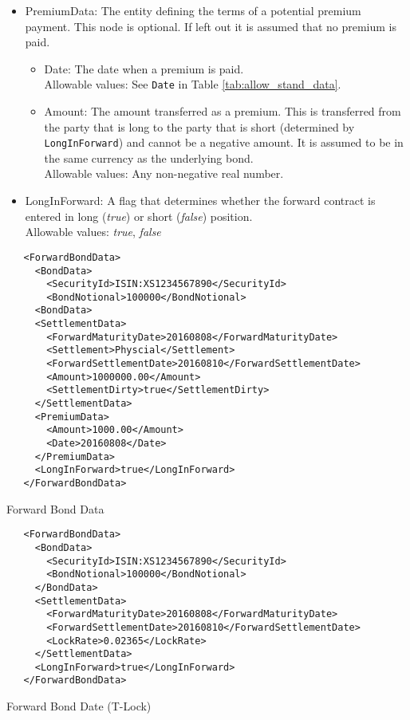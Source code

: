 \begin{itemize}
\begin{itemize}
   \end{itemize}
   \item PremiumData: The entity defining the terms of a potential premium payment. This node is optional. If left out it is assumed that no premium is paid.
   \begin{itemize}
       \item Date: The date when a premium is paid. \\
       Allowable values: See \lstinline!Date! in Table \ref{tab:allow_stand_data}.       
       \item Amount: The amount transferred as a premium. This is transferred from the party that is long to the party
         that is short (determined by \lstinline!LongInForward!) and cannot be a negative amount. It is assumed to be in
         the same currency as the underlying bond.\\
         Allowable values: Any non-negative real number.
   \end{itemize}
   \item LongInForward: A flag that determines whether the forward contract is entered in long (\emph{true}) or short
     (\emph{false}) position. \\
       Allowable values: \emph{true}, \emph{false}     
\end{itemize}
 
\begin{listing}[H]
\begin{verbatim}
   <ForwardBondData>
     <BondData>
       <SecurityId>ISIN:XS1234567890</SecurityId>
       <BondNotional>100000</BondNotional>
     <BondData>
     <SettlementData>
       <ForwardMaturityDate>20160808</ForwardMaturityDate>
       <Settlement>Physcial</Settlement>
       <ForwardSettlementDate>20160810</ForwardSettlementDate>
       <Amount>1000000.00</Amount>
       <SettlementDirty>true</SettlementDirty>
     </SettlementData>
     <PremiumData>
       <Amount>1000.00</Amount>
       <Date>20160808</Date>
     </PremiumData>
     <LongInForward>true</LongInForward>
   </ForwardBondData>
\end{verbatim}
\caption{Forward Bond Data}
\label{lst:forward_bond_refdata}
\end{listing}

\begin{listing}[H]
   \begin{verbatim}
   <ForwardBondData>
     <BondData>
       <SecurityId>ISIN:XS1234567890</SecurityId>
       <BondNotional>100000</BondNotional>
     </BondData>
     <SettlementData>
       <ForwardMaturityDate>20160808</ForwardMaturityDate>
       <ForwardSettlementDate>20160810</ForwardSettlementDate>
       <LockRate>0.02365</LockRate>
     </SettlementData>
     <LongInForward>true</LongInForward>
   </ForwardBondData>
\end{verbatim}
\caption{Forward Bond Date (T-Lock)}
\label{lst:forward_bond_refdata_tlock}
\end{listing}

